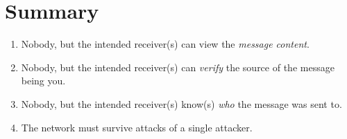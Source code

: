 \section{Summary}
\begin{enumerate}
\item Nobody, but the intended receiver(s) can view the \emph{message content}.
\item Nobody, but the intended receiver(s) can \emph{verify} the source of the message being you.
\item Nobody, but the intended receiver(s) know(s) \emph{who} the message was sent to.
\item The network must survive attacks of a single attacker.
\end{enumerate}


